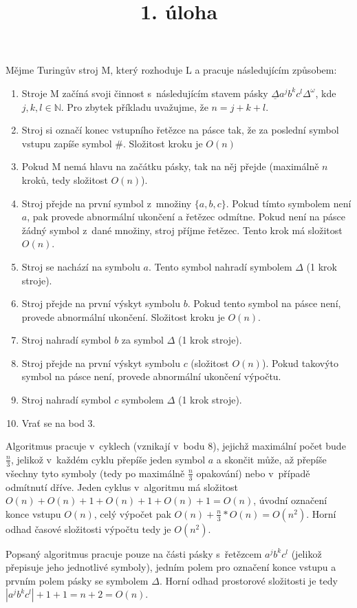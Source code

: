 \documentclass[a4paper]{article}
\title {1. úloha}
\begin{document}
\section*{}
Mějme Turingův stroj M, který rozhoduje L a pracuje následujícím způsobem:
\begin{enumerate}
    \item Stroje M začíná svoji činnost s~následujícím stavem pásky $\underline{\Delta}a^j b^k c^l\Delta^{\omega}$, kde $j,k,l \in \mathbb{N}$.
    Pro zbytek příkladu uvažujme, že $n=j+k+l$.
    \item Stroj si označí konec vstupního řetězce na pásce tak, že za poslední symbol vstupu zapíše symbol $\#$.
    Složitost kroku je $O(n)$
    \item Pokud M nemá hlavu na začátku pásky, tak na něj přejde (maximálně $n$ kroků, tedy složitost $O(n)$).
    \item Stroj přejde na první symbol z~množiny $\{a,b,c\}$.
    Pokud tímto symbolem není $a$, pak provede abnormální ukončení a řetězec odmítne.
    Pokud není na pásce žádný symbol z~dané množiny, stroj příjme řetězec.
    Tento krok má složitost $O(n)$.
    \item Stroj se nachází na symbolu $a$. Tento symbol nahradí symbolem $\Delta$ (1 krok stroje).
    \item Stroj přejde na první výskyt symbolu $b$.
    Pokud tento symbol na pásce není, provede abnormální ukončení.
    Složitost kroku je $O(n)$.
    \item Stroj nahradí symbol $b$ za symbol $\Delta$ (1 krok stroje).
    \item Stroj přejde na první výskyt symbolu $c$ (složitost $O(n)$).
    Pokud takovýto symbol na pásce není, provede abnormální ukončení výpočtu.
    \item Stroj nahradí symbol $c$ symbolem $\Delta$ (1 krok stroje).
    \item Vrať se na bod 3.
\end{enumerate}
Algoritmus pracuje v~cyklech (vznikají v~bodu 8),
jejichž maximální počet bude $\frac{n}{3}$, jelikož v~každém cyklu přepíše jeden symbol $a$ a skončit může, až přepíše
všechny tyto symboly (tedy po maximálně $\frac{n}{3}$ opakování) nebo v~případě odmítnutí dříve.
Jeden cyklus v~algoritmu má složitost $O(n)+O(n)+1+O(n)+1+O(n)+1=O(n)$, úvodní označení konce vstupu $O(n)$, celý výpočet pak
$O(n)+\frac{n}{3}*O(n)=O(n^2)$. Horní odhad časové složitosti výpočtu tedy je $O(n^2)$.

Popsaný algoritmus pracuje pouze na části pásky s~řetězcem $a^j b^k c^l$ (jelikož přepisuje jeho jednotlivé symboly),
jedním polem pro označení konce vstupu a prvním polem pásky se symbolem $\Delta$.
Horní odhad prostorové složitosti je tedy $|a^j b^k c^l|+1+1=n+2=O(n)$. 
\end{document}
